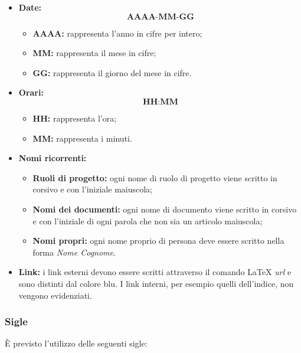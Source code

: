 \documentclass[../NormediProgetto.tex]{subfiles}
\begin{document}
\begin{itemize}
	
	\item{\textbf{Date:}}  \[\textbf{AAAA-MM-GG}\]
	\begin{itemize}
		\item{\textbf{AAAA:}} rappresenta l'anno in cifre per intero;
		\item{\textbf{MM:}} rappresenta il mese in cifre;
		\item{\textbf{GG:}} rappresenta il giorno del mese in cifre.
		
	\end{itemize}
	
	\item{\textbf{Orari:}} \[\textbf{HH:MM}\]
	\begin{itemize}
		\item{\textbf{HH:}} rappresenta l'ora;
		\item{\textbf{MM:}} rappresenta i minuti.
	\end{itemize}
	
	\item{\textbf{Nomi ricorrenti:}}
	\begin{itemize}
		\item{\textbf{Ruoli di progetto:}} ogni nome di ruolo di progetto viene scritto in corsivo e con l’iniziale maiuscola;
		\item{\textbf{Nomi dei documenti:}} ogni nome di documento viene scritto in corsivo e con l’iniziale di ogni parola che non sia un articolo maiuscola;
		\item{\textbf{Nomi propri:}} ogni nome proprio di persona deve essere scritto nella forma \textit{Nome Cognome}.
	\end{itemize}
	
	\item{\textbf{Link:}} i link esterni devono essere scritti attraverso il comando \LaTeX{} \textit{url} e sono distinti dal colore blu. I link interni, per esempio quelli dell'indice, non vengono evidenziati.
\end{itemize}

\subsubsection{Sigle}

È previsto l’utilizzo delle seguenti sigle: 
\end{document}
